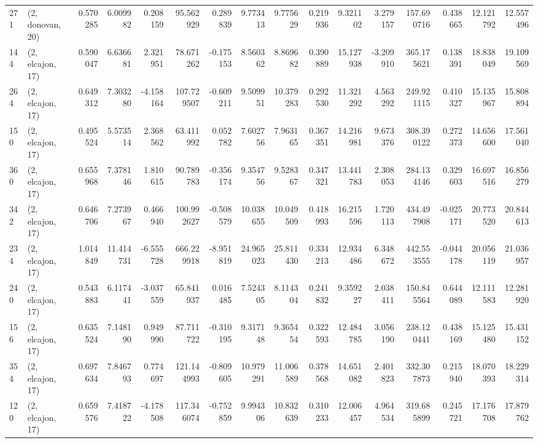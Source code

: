 \begin{tabular}{llrrrrrrrrrrrrrr}
271 &  (2, donovan, 20) &   0.570285 &   6.009982 &   0.208159 &    95.562929 &   0.289839 &   9.773413 &   9.775629 &  0.219936 &   9.321102 &   3.279157 &   157.690716 &  0.438665 &  12.121792 &  12.557496 \\
144 &  (2, elcajon, 17) &   0.590047 &   6.636681 &   2.321951 &    78.671262 &  -0.175153 &   8.560362 &   8.869682 &  0.390889 &  15.127938 &  -3.209910 &   365.175621 &  0.138391 &  18.838049 &  19.109569 \\
264 &  (2, elcajon, 17) &   0.649312 &   7.303280 &  -4.158164 &   107.729507 &  -0.609211 &   9.509951 &  10.379283 &  0.292530 &  11.321292 &   4.563292 &   249.921115 &  0.410327 &  15.135967 &  15.808894 \\
150 &  (2, elcajon, 17) &   0.495524 &   5.573514 &   2.368562 &    63.411992 &   0.052782 &   7.602756 &   7.963165 &  0.367351 &  14.216981 &   9.673376 &   308.390122 &  0.272373 &  14.656600 &  17.561040 \\
360 &  (2, elcajon, 17) &   0.655968 &   7.378146 &   1.810615 &    90.789783 &  -0.356174 &   9.354756 &   9.528367 &  0.347321 &  13.441783 &   2.308053 &   284.134146 &  0.329603 &  16.697516 &  16.856279 \\
342 &  (2, elcajon, 17) &   0.646706 &   7.273967 &   0.466940 &   100.992627 &  -0.508579 &  10.038655 &  10.049509 &  0.418993 &  16.215596 &   1.720113 &   434.497908 & -0.025171 &  20.773520 &  20.844613 \\
234 &  (2, elcajon, 17) &   1.014849 &  11.414731 &  -6.555728 &   666.229918 &  -8.951819 &  24.965023 &  25.811430 &  0.334213 &  12.934486 &   6.348672 &   442.553555 & -0.044178 &  20.056119 &  21.036957 \\
240 &  (2, elcajon, 17) &   0.543883 &   6.117441 &  -3.037559 &    65.841937 &   0.016485 &   7.524305 &   8.114304 &  0.241832 &   9.359227 &   2.038411 &   150.845564 &  0.644089 &  12.111583 &  12.281920 \\
156 &  (2, elcajon, 17) &   0.635524 &   7.148190 &   0.949990 &    87.711722 &  -0.310195 &   9.317148 &   9.365454 &  0.322593 &  12.484785 &   3.056190 &   238.120441 &  0.438169 &  15.125480 &  15.431152 \\
354 &  (2, elcajon, 17) &   0.697634 &   7.846793 &   0.774697 &   121.144993 &  -0.809605 &  10.979291 &  11.006589 &  0.378568 &  14.651082 &   2.401823 &   332.307873 &  0.215940 &  18.070393 &  18.229314 \\
120 &  (2, elcajon, 17) &   0.659576 &   7.418722 &  -4.178508 &   117.346074 &  -0.752859 &   9.994306 &  10.832639 &  0.310233 &  12.006457 &   4.964534 &   319.685899 &  0.245721 &  17.176708 &  17.879762 \\

\end{tabular}
